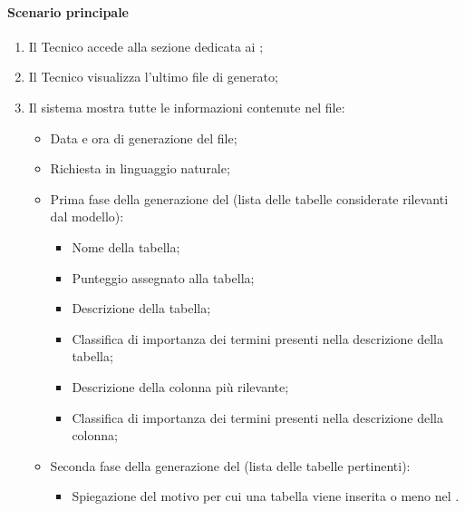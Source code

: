 \paragraph*{Scenario principale}
\begin{enumerate}
  \item Il Tecnico accede alla sezione dedicata ai ;
  \item Il Tecnico visualizza l'ultimo file di  generato;
  \item Il sistema mostra tutte le informazioni contenute nel file:
    \begin{itemize}
      \item Data e ora di generazione del file;
      \item Richiesta in linguaggio naturale;
      \item Prima fase della generazione del  (lista delle tabelle considerate rilevanti dal modello):
      \begin{itemize}
        \item Nome della tabella;
        \item Punteggio assegnato alla tabella;
        \item Descrizione della tabella;
        \item Classifica di importanza dei termini presenti nella descrizione della tabella;
        \item Descrizione della colonna più rilevante;
        \item Classifica di importanza dei termini presenti nella descrizione della colonna;
      \end{itemize}
      \item Seconda fase della generazione del  (lista delle tabelle pertinenti):
      \begin{itemize}
        \item Spiegazione del motivo per cui una tabella viene inserita o meno nel .
      \end{itemize}
    \end{itemize}
\end{enumerate}